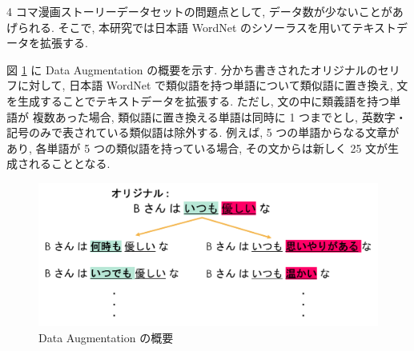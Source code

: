 4 コマ漫画ストーリーデータセットの問題点として, データ数が少ないことがあげられる.
そこで, 本研究では日本語 WordNet \cite{word_net_jp} のシソーラスを用いてテキストデータを拡張する.

図 \ref{fig:data_aug} に Data Augmentation の概要を示す.
分かち書きされたオリジナルのセリフに対して, 日本語 WordNet で類似語を持つ単語について類似語に置き換え, 文を生成することでテキストデータを拡張する. ただし, 文の中に類義語を持つ単語が
複数あった場合, 類似語に置き換える単語は同時に 1 つまでとし, 英数字・記号のみで表されている類似語は除外する. 例えば, 5 つの単語からなる文章があり,
各単語が 5 つの類似語を持っている場合, その文からは新しく 25 文が生成されることとなる.

\begin{figure}[h]
  \centering
  \includegraphics[width=0.8\hsize]{doc/figures/data_aug.png}
  \caption{Data Augmentation の概要}
  \label{fig:data_aug}
\end{figure}
